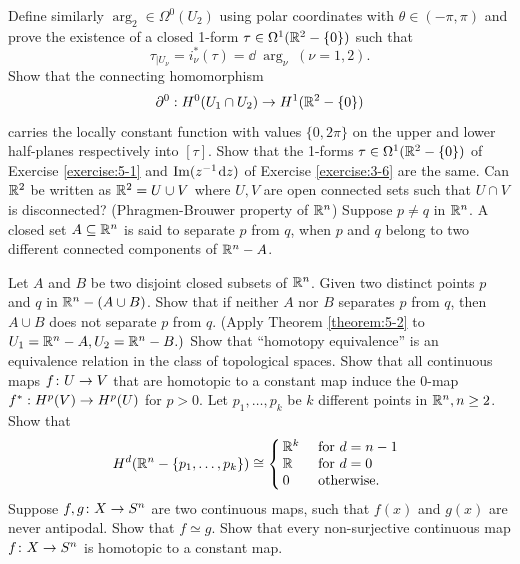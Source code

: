\begin{enumerate}[label=\theexercise.\arabic*.,ref=\theexercise.\arabic*,leftmargin=2.7em]
    Define similarly ${\arg }_{2} \in  {\Omega }^{0}( {U}_{2})$ using polar coordinates with $\theta  \in  ( {-\pi,\pi })$ and prove the existence of a closed 1-form $\tau  \in  {\Omega }^{1}( {{\mathbb{R}}^{2}-\{ 0\} })$ such that
    \[
      {\tau }_{\mid {U}_{\nu }} = {i}_{\nu }^*( \tau )  = \dd\;{\arg }_{\nu }\;( {\nu  = 1,2}).
    \]
    Show that the connecting homomorphism
    \[
      {\partial }^{0} : {H}^{0}( {{U}_{1} \cap  {U}_{2}})  \rightarrow  {H}^{1}( {{\mathbb{R}}^{2}-\{ 0\} })
    \]
    carries the locally constant function with values $\{ 0,{2\pi }\}$ on the upper and lower half-planes respectively into $[  \tau ]$.
  \NewItem Show that the 1-forms $\tau  \in  {\Omega }^{1}( {{\mathbb{R}}^{2}-\{ 0\} })$ of Exercise \ref{exercise:5-1} and $\im( {{z}^{-1}{\dd z}})$ of Exercise \ref{exercise:3-6} are the same.
  \NewItem Can ${\mathbb{R}}^{2}$ be written as ${\mathbb{R}}^{2} = U \cup  V$ where $U,V$ are open connected sets such that $U \cap  V$ is disconnected?
  \NewItem (Phragmen-Brouwer property of ${\mathbb{R}}^{n}$) Suppose $p \neq  q$ in ${\mathbb{R}}^{n}$. A closed set $A \subseteq  {\ensuremath{\mathbb{R}}}^{n}$ is said to separate $p$ from $q$, when $p$ and $q$ belong to two different connected components of ${{\mathbb{R}}}^{n}- A$.\par
    Let $A$ and $B$ be two disjoint closed subsets of ${\mathbb{R}}^{n}$. Given two distinct points $p$ and $q$ in ${\mathbb{R}}^{n}- ( {A \cup  B})$. Show that if neither $A$ nor $B$ separates $p$ from $q$, then $A \cup  B$ does not separate $p$ from $q$. (Apply Theorem \ref{theorem:5-2} to ${U}_{1} = {\mathbb{R}}^{n}- A,{U}_{2} = {\mathbb{R}}^{n}- B.)$
  \newchap[6]
  \NewItem Show that ``homotopy equivalence'' is an equivalence relation in the class of topological spaces.
  \NewItem Show that all continuous maps $f\colon U \rightarrow  V$ that are homotopic to a constant map induce the 0-map $f^*: {H}^{p}( V)  \rightarrow  {H}^{p}( U)$ for $p > 0$.
  \NewItem Let ${p}_{1},\ldots,{p}_{k}$ be $k$ different points in ${\mathbb{R}}^{n},n \geq  2$. Show that
    \[
      {H}^{d}( {{\mathbb{R}}^{n}- \left\{  {{p}_{1},\ldots,{p}_{k}}\right\}  })  \cong  \left\{\!\!\begin{array}{ll} {\ensuremath{\mathbb{R}}}^{k} & \text{ for }d = n- 1 \\  \mathbb{R} & \text{ for }d = 0 \\  0 & \text{ otherwise. } \end{array}\right.
    \]
  \NewItem Suppose $f,g\colon X \rightarrow  {S}^{n}$ are two continuous maps, such that $f( x)$ and $g( x)$ are never antipodal. Show that $f \simeq  g$.
    Show that every non-surjective continuous map $f\colon X \rightarrow  {S}^{n}$ is homotopic to a constant map.

\end{enumerate}
